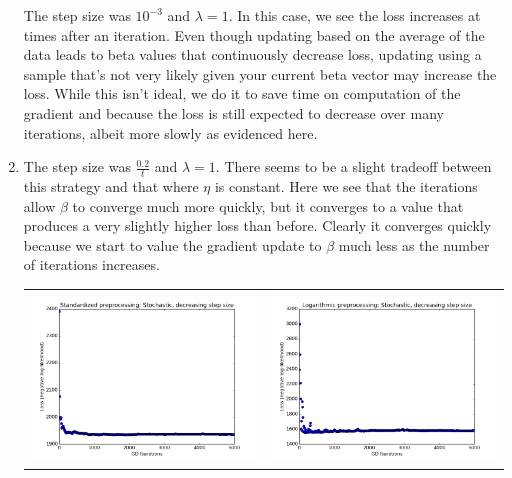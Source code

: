 \documentclass[11pt]{article}
\begin{document}
\begin{enumerate}[1.]
\begin{tabular}{cc}
\end{tabular}
The step size was $10^{-3}$ and $\lambda=1$. In this case, we see the loss increases at times after an iteration. Even though updating based on the average of the data leads to beta values that continuously decrease loss, updating using a sample that's not very likely given your current beta vector may increase the loss. While this isn't ideal, we do it to save time on computation of the gradient and because the loss is still expected to decrease over many iterations, albeit more slowly as evidenced here.
\newpage
\item The step size was $\frac{0.2}t$ and $\lambda=1$. There seems to be a slight tradeoff between this strategy and that where $\eta$ is constant. Here we see that the iterations allow $\beta$ to converge much more quickly, but it converges to a value that produces a very slightly higher loss than before. Clearly it converges quickly because we start to value the gradient update to $\beta$ much less as the number of iterations increases. \\
\begin{tabular}{cc}
\includegraphics[scale=0.4]{images/p3_3_Standardized} & \includegraphics[scale=0.4]{images/p3_3_Logarithmic} \\

\end{tabular}
\end{enumerate}
\end{document}
